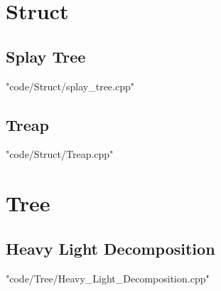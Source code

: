\documentclass [landscape,8pt,a4paper,twocolumn]{article}
\begin{document}
\section{Struct}
\subsection{Splay Tree}
 {"code/Struct/splay_tree.cpp"}
\subsection{Treap}
 {"code/Struct/Treap.cpp"}
\section{Tree}
\subsection{Heavy Light Decomposition}
 {"code/Tree/Heavy_Light_Decomposition.cpp"}
\end{document}
